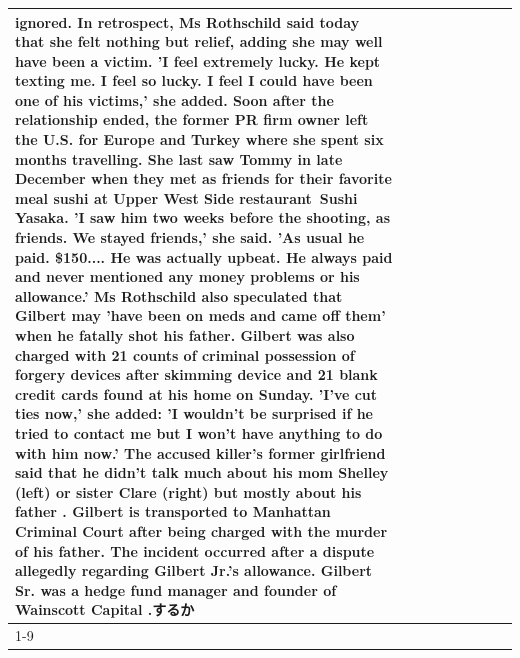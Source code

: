 \begin{table}[H]
\begin{tabular}{lllrlllll}
ignored. In retrospect, Ms Rothschild said today that she felt nothing but relief, adding she may well have been a victim. 'I feel extremely lucky. He kept texting me. I feel so lucky. I feel I could have been one of his victims,' she added. Soon after the relationship ended, the former PR firm owner left the U.S. for Europe and Turkey where she spent six months  travelling. She last saw Tommy in late December when they met as friends for their favorite meal sushi at Upper West Side restaurant Sushi Yasaka. 'I saw him two weeks before the shooting, as friends. We stayed friends,' she said. 'As usual he paid. \$150.... He was actually upbeat. He always paid and never mentioned any money problems or his allowance.' Ms Rothschild also speculated that Gilbert may 'have been on meds and came off them' when he fatally shot his father. Gilbert was also charged with 21 counts of criminal possession of forgery devices after skimming device and 21 blank credit cards found at his home on Sunday. 'I've cut ties now,' she added: 'I wouldn’t be surprised if he tried to contact me but I won’t have anything to do with him now.' The accused killer's former girlfriend said that he didn't talk much about his mom Shelley (left) or sister Clare (right) but mostly about his father . Gilbert is transported to Manhattan Criminal Court  after being charged with the murder of his father. The incident occurred after a dispute allegedly regarding Gilbert Jr.'s allowance. Gilbert Sr. was a hedge fund manager and founder of Wainscott Capital .するか \\
\cline{1-9}

\end{tabular}
\end{table}
